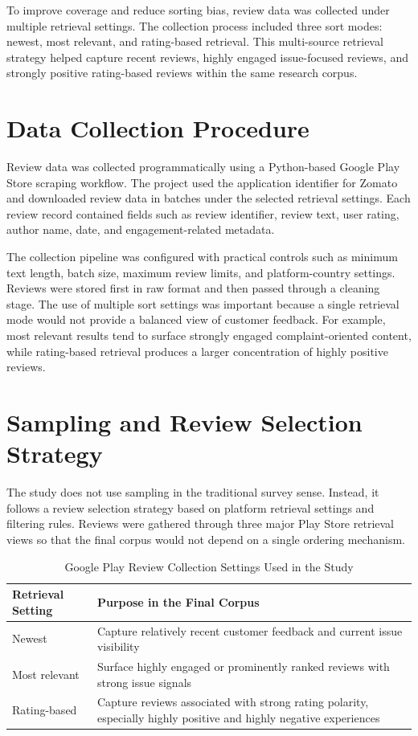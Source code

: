 To improve coverage and reduce sorting bias, review data was collected under multiple retrieval settings. The collection process included three sort modes: newest, most relevant, and rating-based retrieval. This multi-source retrieval strategy helped capture recent reviews, highly engaged issue-focused reviews, and strongly positive rating-based reviews within the same research corpus.

\section{Data Collection Procedure}

Review data was collected programmatically using a Python-based Google Play Store scraping workflow. The project used the application identifier for Zomato and downloaded review data in batches under the selected retrieval settings. Each review record contained fields such as review identifier, review text, user rating, author name, date, and engagement-related metadata.

The collection pipeline was configured with practical controls such as minimum text length, batch size, maximum review limits, and platform-country settings. Reviews were stored first in raw format and then passed through a cleaning stage. The use of multiple sort settings was important because a single retrieval mode would not provide a balanced view of customer feedback. For example, most relevant results tend to surface strongly engaged complaint-oriented content, while rating-based retrieval produces a larger concentration of highly positive reviews.

\section{Sampling and Review Selection Strategy}

The study does not use sampling in the traditional survey sense. Instead, it follows a review selection strategy based on platform retrieval settings and filtering rules. Reviews were gathered through three major Play Store retrieval views so that the final corpus would not depend on a single ordering mechanism.

\begin{table}[h]
\centering
\caption{Google Play Review Collection Settings Used in the Study}
\small
\begin{tabular}{L{0.23\textwidth}L{0.55\textwidth}}
\toprule
\textbf{Retrieval Setting} & \textbf{Purpose in the Final Corpus} \\
\midrule
Newest & Capture relatively recent customer feedback and current issue visibility \\
Most relevant & Surface highly engaged or prominently ranked reviews with strong issue signals \\
Rating-based & Capture reviews associated with strong rating polarity, especially highly positive and highly negative experiences \\
\bottomrule
\end{tabular}
\normalsize
\end{table}

